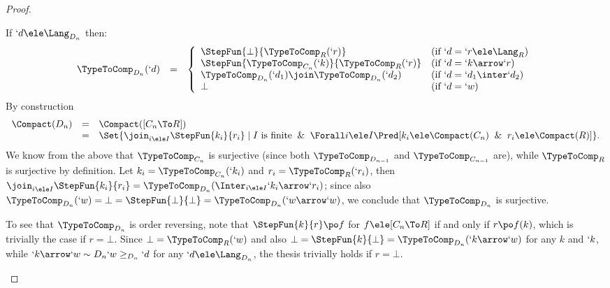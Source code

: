 \documentclass{lmcs}
\begin{document}
\begin{proof}
\begin{description}
If $`d \ele \Lang_{D_n}$ then:
%
 \[ \begin{array}{rcl}
\TypeToComp_{D_n}(`d) 
	&=& 
\left \{
 \begin{array}{ll}
\StepFun{\bot }{ \TypeToComp_R(`r)} & (\textrm{if }`d = `r \ele \Lang_R) \\
\StepFun{\TypeToComp_{C_n}(`k) }{ \TypeToComp_R(`r)} & (\textrm{if }`d = `k\arrow `r ) \\ 
\TypeToComp_{D_n}(`d_1)\join \TypeToComp_{D_n}(`d_2) & (\textrm{if }`d = `d_1\inter `d_2) \\ 
\bot & (\textrm{if }`d = `w)
 \end{array} \right.
 \end{array} \]
By construction 
%
 \[ \begin{array}{rcl}
\Compact(D_{n}) 
	&=& 
\Compact([C_n \To R]) \\
	&=& \Set{\join_{i \ele I} \StepFun{k_i }{ r_i} \mid I \textrm{ is finite} \And \Forall i \ele I \Pred[ k_i \ele \Compact(C_n) \And r_i \ele \Compact(R) ] }.
 \end{array} \] 
We know from the above that $\TypeToComp_{C_n}$ is surjective (since both $\TypeToComp_{D_{n{-}1}}$ and $\TypeToComp_{C_{n{-}1}}$ are), while $\TypeToComp_R$ is surjective by definition. 
Let $k_i = \TypeToComp_{C_n}(`k_i)$ and $r_i = \TypeToComp_R(`r_i)$, then
$\join_{i \ele I} \StepFun{k_i }{ r_i} = \TypeToComp_{D_n}(\Inter_{i \ele I} `k_i\arrow `r_i)$; since also $ \TypeToComp_{D_n}(`w) = \bot = \StepFun{\bot }{ \bot} = \TypeToComp_{D_n}(`w\arrow `w)$, we conclude that $\TypeToComp_{D_n}$ is surjective.

To see that $\TypeToComp_{D_n}$ is order reversing, note that $\StepFun{k }{ r} \po f$ for $f \ele [C_n \To R]$ if and only if $r \po f(k)$, which is trivially the case if $r = \bot$. Since $\bot = \TypeToComp_R(`w)$ and also $\bot = \StepFun{k }{ \bot} = \TypeToComp_{D_n}(`k\arrow `w)$ for any $k$ and $`k$, while $`k\arrow `w \sim{D_n} `w \geq_{D_n}`d$ for any $`d \ele \Lang_{D_n}$, the thesis trivially holds if $r = \bot$.


\end{description}
\end{proof}
\end{document}
